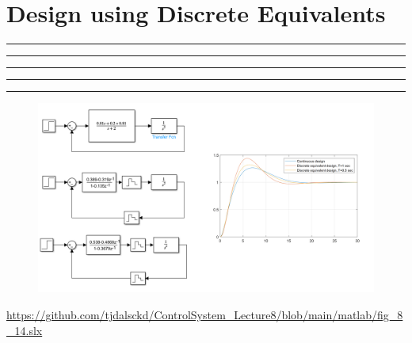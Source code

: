 \setcounter{chapter}{7}
\setcounter{section}{2}
\section{Design using Discrete Equivalents}
\vspace{-8pt} \hrule \hrule \hrule \hrule \hrule  \vspace{12pt}
		\begin{figure}[h]
			\centering
			\includegraphics[width=24cm]{./FIG_Franklin/fig8-smc10.png}
		\end{figure}
	    \url{https://github.com/tjdalsckd/ControlSystem_Lecture8/blob/main/matlab/fig_8_14.slx}		